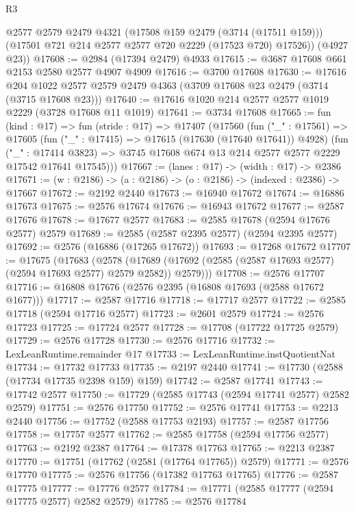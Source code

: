 \begin{lexlean}{R3}
\begin{coremodule}
        @2577
        @2579
        @2479
        @4321
        (@17508 @159 @2479 (@3714 (@17511 @159)))
        (@17501 @721 @214 @2577 @2577 @720 @2229 (@17523 @720) @17526))
      (@4927 @23))
@17608 := @2984 (@17394 @2479) @4933
@17615 := @3687 @17608 @661 @2153 @2580 @2577 @4907 @4909
@17616 := @3700 @17608
@17630 := @17616
    @204
    @1022
    @2577
    @2579
    @2479
    @4363
    (@3709 @17608 @23 @2479 (@3714 (@3715 @17608 @23)))
@17640 := @17616 @1020 @214 @2577 @2577 @1019 @2229 (@3728 @17608 @11 @1019)
@17641 := @3734 @17608
@17665 := fun (kind : @17) =>
  fun (stride : @17) =>
  @17407
    (@17560
      (fun ("_" : @17561) =>
      @17605
        (fun ("_" : @17415) => @17615 (@17630 (@17640 @17641)) @4928)
        (fun ("_" : @17414 @3823) =>
        @3745 @17608 @674 @13 @214 @2577 @2577 @2229 @17542 @17641 @17545)))
@17667 := (lanes : @17) -> (width : @17) -> @2386
@17671 := (w : @2186) -> (a : @2186) -> (o : @2186) -> (indexed : @2386) -> @17667
@17672 := @2192 @2440
@17673 := @16940 @17672
@17674 := @16886 @17673
@17675 := @2576 @17674
@17676 := @16943 @17672
@17677 := @2587 @17676
@17678 := @17677 @2577
@17683 := @2585 @17678 (@2594 @17676 @2577) @2579
@17689 := @2585 (@2587 @2395 @2577) (@2594 @2395 @2577)
@17692 := @2576 (@16886 (@17265 @17672))
@17693 := @17268 @17672
@17707 := @17675
    (@17683
      (@2578 (@17689 (@17692 (@2585 (@2587 @17693 @2577) (@2594 @17693 @2577) @2579 @2582)) @2579)))
@17708 := @2576 @17707
@17716 := @16808 @17676 (@2576 @2395 (@16808 @17693 (@2588 @17672 @1677)))
@17717 := @2587 @17716
@17718 := @17717 @2577
@17722 := @2585 @17718 (@2594 @17716 @2577)
@17723 := @2601 @2579
@17724 := @2576 @17723
@17725 := @17724 @2577
@17728 := @17708 (@17722 @17725 @2579)
@17729 := @2576 @17728
@17730 := @2576 @17716
@17732 := LexLeanRuntime.remainder @17
@17733 := LexLeanRuntime.instQuotientNat
@17734 := @17732 @17733
@17735 := @2197 @2440
@17741 := @17730 (@2588 (@17734 @17735 @2398 @159) @159)
@17742 := @2587 @17741
@17743 := @17742 @2577
@17750 := @17729 (@2585 @17743 (@2594 @17741 @2577) @2582 @2579)
@17751 := @2576 @17750
@17752 := @2576 @17741
@17753 := @2213 @2440
@17756 := @17752 (@2588 @17753 @2193)
@17757 := @2587 @17756
@17758 := @17757 @2577
@17762 := @2585 @17758 (@2594 @17756 @2577)
@17763 := @2192 @2387
@17764 := @17378 @17763
@17765 := @2213 @2387
@17770 := @17751 (@17762 (@2581 (@17764 @17765)) @2579)
@17771 := @2576 @17770
@17775 := @2576 @17756 (@17382 @17763 @17765)
@17776 := @2587 @17775
@17777 := @17776 @2577
@17784 := @17771 (@2585 @17777 (@2594 @17775 @2577) @2582 @2579)
@17785 := @2576 @17784

\end{coremodule}
\end{lexlean}
